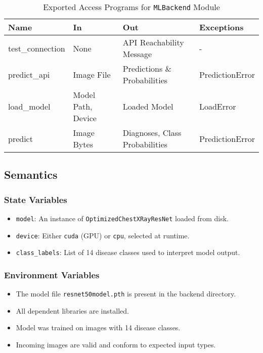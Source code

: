 \documentclass[12pt, titlepage]{article}
\begin{document}
\begin{table}[h!]
\centering
\begin{tabular}{|l|l|l|l|}
\hline
\textbf{Name}         & \textbf{In}           & \textbf{Out}             & \textbf{Exceptions} \\ \hline
test\_connection      & None                  & API Reachability Message & -                  \\ \hline
predict\_api          & Image File            & Predictions \& Probabilities & PredictionError   \\ \hline
load\_model           & Model Path, Device    & Loaded Model             & LoadError          \\ \hline
predict               & Image Bytes           & Diagnoses, Class Probabilities & PredictionError   \\ \hline
\end{tabular}
\caption{Exported Access Programs for \texttt{MLBackend} Module}
\end{table}

\subsection{Semantics}
\label{sec:MLBackendSemantics}

\subsubsection{State Variables}
\label{sec:MLBackendStateVariables}

\begin{itemize}
    \item \texttt{model}: An instance of \texttt{OptimizedChestXRayResNet} loaded from disk.
    \item \texttt{device}: Either \texttt{cuda} (GPU) or \texttt{cpu}, selected at runtime.
    \item \texttt{class\_labels}: List of 14 disease classes used to interpret model output.
\end{itemize}

\subsubsection{Environment Variables}
\label{sec:MLBackendEnvVariables}

\begin{itemize}
    \item The model file \texttt{resnet50model.pth} is present in the backend directory.
    \item All dependent libraries are installed.
    \item Model was trained on images with 14 disease classes.
    \item Incoming images are valid and conform to expected input types.
\end{itemize}
\end{document}
